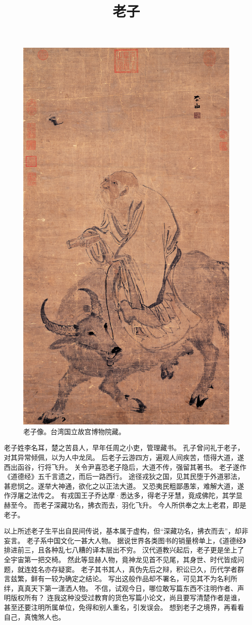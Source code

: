 \documentclass[11pt]{article}
\title{老子}
\date{}
\begin{document}
  \maketitle
  
  \begin{figure}[H]
    \centering
    \includegraphics[height=0.7\textwidth]{../Figures/LaoZi.jpg}
    \caption{老子像。台湾国立故宫博物院藏。}
  \end{figure}

  \newpage
  
  \linenumbers

老子姓李名耳，楚之苦县人，早年任周之小吏，管理藏书。
孔子曾问礼于老子，对其异常倾佩，以为人中龙凤。
后老子云游四方，遍观人间疾苦，悟得大道，遂西出函谷，行将飞升。
关令尹喜恐老子隐后，大道不传，强留其著书。
老子遂作《道德经》五千言遗之，而后一路西行。
途径戎狄之国，见其民堕于外道邪法，甚悲悯之。遂举大神通，欲化之以正法大道。
又恐夷民粗鄙愚笨，难解大道，遂作浮屠之法传之。
有戎国王子乔达摩·悉达多，得老子牙慧，竟成佛陀，其学显赫至今。
而老子深藏功名，拂衣而去，羽化飞升。
今人所供奉之太上老君，即是老子。

\newline

以上所述老子生平出自民间传说，基本属于虚构，但“深藏功名，拂衣而去”，却非妄言。
老子系中国文化一甚大人物。
据说世界各类图书的销量榜单上，《道德经》排进前三，且各种乱七八糟的译本层出不穷。
汉代道教兴起后，老子更是坐上了全宇宙第一把交椅。
然此等显赫人物，竟神龙见首不见尾，其身世、时代皆成问题，就连姓名亦存疑窦。
老子其书其人，真伪先后之辩，积讼已久，历代学者群言兹繁，鲜有一较为确定之结论。
写出这般作品却不署名，可见其不为名利所绊，真真天下第一潇洒人物。
不信，试观今日，哪位敢写篇东西不注明作者、声明版权所有？
连我这种没受过教育的货色写篇小论文，尚且要写清楚作者是谁，甚至还要注明所属单位，免得和别人重名，引发误会。
想到老子之境界，再看看自己，真愧煞人也。
  
\end{document}
